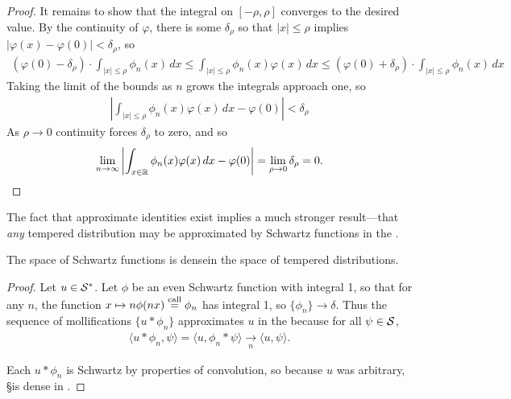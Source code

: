 \begin{proof}
      It remains to show that the integral on $[-\rho,\rho]$ converges to the desired value.
      By the continuity of $\varphi$, there is some $\delta_\rho$ so that $|x|\le\rho$ implies $|\varphi(x)-\varphi(0)|<\delta_\rho$, so
      \begin{align*}
        (\varphi(0)-\delta_\rho)\cdot \int_{|x|\le\rho} \phi_n(x)\,dx
        \le \int_{|x|\le\rho} \phi_n(x)\varphi(x)\,dx
        \le (\varphi(0)+\delta_\rho)\cdot \int_{|x|\le\rho} \phi_n(x)\, dx
      \end{align*}
      Taking the limit of the bounds as $n$ grows the integrals approach one, so
      \begin{align*}
        \left| \int_{|x|\le\rho} \phi_n(x)\varphi(x)\,dx - \varphi(0) \right|
        < \delta_\rho
      \end{align*}
      As $\rho\rightarrow0$ continuity forces $\delta_\rho$ to zero, and so
      \begin{align*}
        \lim_{n\rightarrow\infty} \left| \int_{x\in\R} \phi_n(x)\varphi(x)\,dx - \varphi(0) \right|
        = \lim_{\rho\rightarrow 0} \delta_\rho
        = 0 \text{.}
      \end{align*}
    \end{proof}

    The fact that approximate identities exist implies a much stronger result---that \emph{any} tempered distribution may be approximated by Schwartz functions in the \ws.

    \begin{thm}
      \label{thm:sdenseinss}
      The space of Schwartz functions is dense\footnotemark in the space of tempered distributions.
    \end{thm}
    \begin{proof}
      Let $u\in\SS$.
      Let $\phi$ be an even Schwartz function with integral 1, so that for any $n$, the function $x\mapsto n\phi(nx) \call \phi_n$ has integral 1, so $\{\phi_n\}\rightarrow\delta$.
      Thus the sequence of mollifications $\{u*\phi_n\}$ approximates $u$ in the \ws because for all $\psi\in\S$, 
      \begin{align*}
        \langle u*\phi_n, \psi\rangle = \langle u, \phi_n*\psi\rangle \underset{n}{\longrightarrow} \langle u,\psi\rangle \text{.}
      \end{align*}

      Each $u*\phi_n$ is Schwartz by properties of convolution, so because $u$ was arbitrary, \S is dense in \SS.
    \end{proof}


